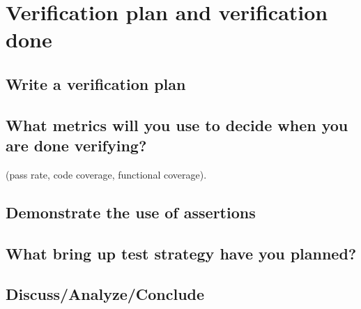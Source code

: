 \section{Verification plan and verification done}
\subsection{Write a verification plan}
\subsection{What metrics will you use to decide when you are done verifying?}
(pass rate, code coverage, functional coverage).
\subsection{Demonstrate the use of assertions}
\subsection{What bring up test strategy have you planned?}
\subsection{Discuss/Analyze/Conclude}